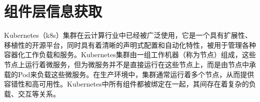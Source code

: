 \section{组件层信息获取}
Kubernetes（k8s）集群\cite{bernstein2014containers}在云计算行业中已经被广泛使用，它是一个具有扩展性、移植性的开源平台，同时具有着清晰的声明式配置和自动化特性，被用于管理各种容器化工作负载和服务。Kubernetes集群由一组工作机器（称为节点）组成，这些节点上运行着微服务，但为微服务并不是直接运行在这些节点上，而是由节点中承载的Pod来负载这些微服务。在生产环境中，集群通常运行着多个节点，从而提供容错性和高可用性。Kubernetes中所有组件都被绑定在一起，其间存在着复杂的负载、交互等关系。

